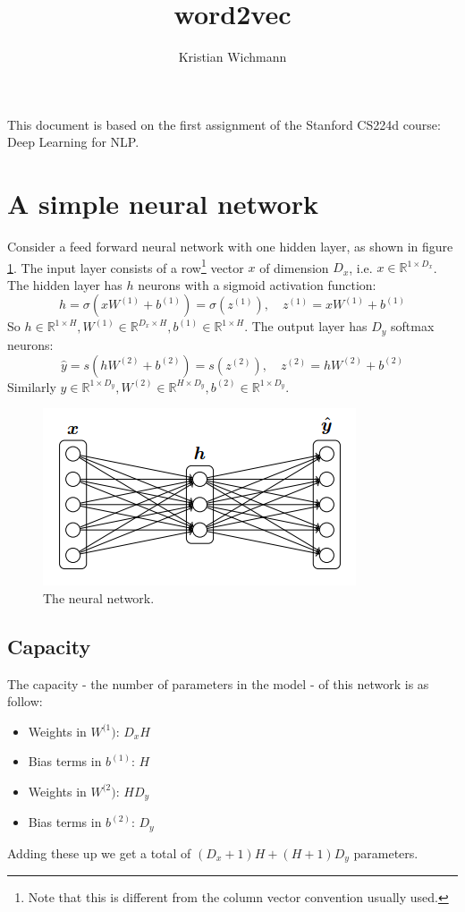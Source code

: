 \documentclass[12pt, a4paper]{article}
\title{word2vec}
\author{Kristian Wichmann}
\numberwithin{equation}{section}
\begin{document}
\maketitle

This document is based on the first assignment of the Stanford CS224d course: Deep Learning for NLP.

\section{A simple neural network}
Consider a feed forward neural network with one hidden layer, as shown in figure \ref{fig:nn}. The input layer consists of a row\footnote{Note that this is different from the column vector convention usually used.} vector $x$ of dimension $D_x$, i.e. $x\in\mathbb{R}^{1\times D_x}$. The hidden layer has $h$ neurons with a sigmoid activation function:
\begin{equation}
h=\sigma(xW^{(1)}+b^{(1)})=\sigma(z^{(1)}),\quad z^{(1)}=xW^{(1)}+b^{(1)}
\end{equation}
So $h\in\mathbb{R}^{1\times H}, W^{(1)}\in\mathbb{R}^{D_x\times H}, b^{(1)}\in\mathbb{R}^{1\times H}$. The output layer has $D_y$ softmax neurons:
\begin{equation}
\hat{y}=s(hW^{(2)}+b^{(2)})=s(z^{(2)}),\quad z^{(2)}=hW^{(2)}+b^{(2)}
\end{equation}
Similarly $\hat{y}\in\mathbb{R}^{1\times D_y}, W^{(2)}\in\mathbb{R}^{H\times D_y}, b^{(2)}\in\mathbb{R}^{1\times D_y}$.

\begin{figure}
\centering
\includegraphics{w2v_nn}
\caption{The neural network.}
\label{fig:nn}
\end{figure}

\subsection{Capacity}
The capacity - the number of parameters in the model - of this network is as follow:
\begin{itemize}
\item Weights in $W^{(1})$: $D_x H$
\item Bias terms in $b^{(1)}$: $H$
\item Weights in $W^{(2})$: $H D_y$
\item Bias terms in $b^{(2)}$: $D_y$
\end{itemize}
Adding these up we get a total of $(D_x+1)H+(H+1)D_y$ parameters.
\end{document}
